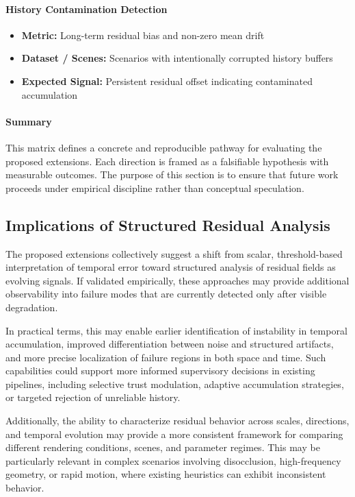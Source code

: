 \documentclass[11pt,letterpaper]{article}
\theoremstyle{gcresult}
\theoremstyle{definition}
\begin{document}
\paragraph{History Contamination Detection}
\begin{itemize}
    \item \textbf{Metric:} Long-term residual bias and non-zero mean drift
    \item \textbf{Dataset / Scenes:} Scenarios with intentionally corrupted history buffers
    \item \textbf{Expected Signal:} Persistent residual offset indicating contaminated accumulation
\end{itemize}

\paragraph{Summary}
This matrix defines a concrete and reproducible pathway for evaluating the proposed extensions. Each direction is framed as a falsifiable hypothesis with measurable outcomes. The purpose of this section is to ensure that future work proceeds under empirical discipline rather than conceptual speculation.

\subsection{Implications of Structured Residual Analysis}

The proposed extensions collectively suggest a shift from scalar, threshold-based interpretation of temporal error toward structured analysis of residual fields as evolving signals. If validated empirically, these approaches may provide additional observability into failure modes that are currently detected only after visible degradation.

In practical terms, this may enable earlier identification of instability in temporal accumulation, improved differentiation between noise and structured artifacts, and more precise localization of failure regions in both space and time. Such capabilities could support more informed supervisory decisions in existing pipelines, including selective trust modulation, adaptive accumulation strategies, or targeted rejection of unreliable history.

Additionally, the ability to characterize residual behavior across scales, directions, and temporal evolution may provide a more consistent framework for comparing different rendering conditions, scenes, and parameter regimes. This may be particularly relevant in complex scenarios involving disocclusion, high-frequency geometry, or rapid motion, where existing heuristics can exhibit inconsistent behavior.
\end{document}
